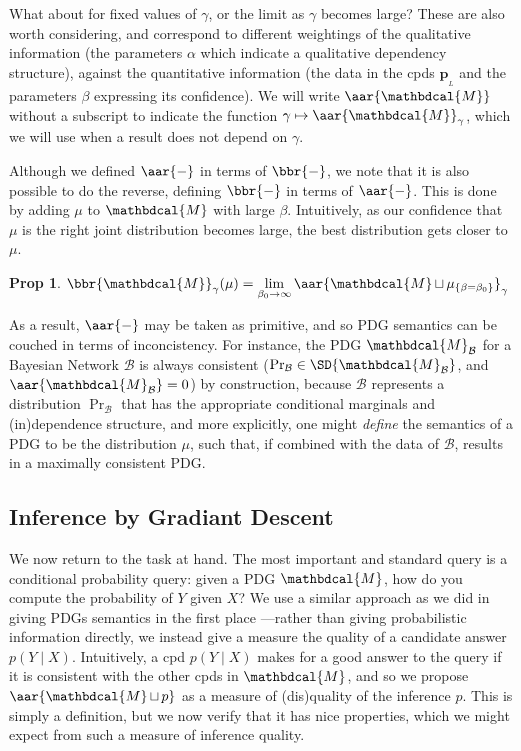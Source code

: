 \documentclass{article}
\theoremstyle{plain}
\newtheorem{prop}[theorem]{Prop}
\theoremstyle{definition}
\theoremstyle{remark}
\newcommand\mat[1]{\mathbf{#1}}
\newcommand{\bp}[1][L]{\mat{p}_{\!_{#1}\!}}
\newcommand{\dg}[1]{\mathbdcal{#1}}
\newcommand\smid{\!\mid\!}
\DeclareMathOperator{\bundle}{\sqcup}
\newcommand{\PDGof}[1]{{\dg M}_{#1}}
\begin{document}
What about for fixed values of $\gamma$, or the limit as $\gamma$ becomes large?
These are also worth considering, and correspond to different weightings of the
qualitative information (the parameters $\alpha$ which indicate a qualitative
dependency structure), against the quantitative information (the data in the
cpds $\bp{}$ and the parameters $\beta$ expressing its confidence). 
We will write $\aar{\dg M}$ without a subscript to indicate the function
$\gamma \mapsto \aar{\dg M}_\gamma$, which we will use when a result does not
depend on $\gamma$.

Although we defined $\aar{-}$ in terms of $\bbr{-}$, 
we note that it is also possible to do the reverse,
defining $\bbr{-}$ in terms of $\aar{-}$.
This is done by adding $\mu$ to $\dg M$ with large $\beta$. 
Intuitively, as our confidence that $\mu$ is the right
joint distribution becomes large, the best distribution
gets closer to $\mu$.

\begin{prop} \label{prop:sementics-via-inconsistency}
	$\displaystyle
		\bbr{\dg M}_\gamma(\mu) 
			= \lim_{\beta_0 \to \infty} \aar{\dg M \bundle \mu_{\{\beta=\beta_0\}}}_\gamma
	$
\end{prop}

As a result, $\aar{-}$  may be taken as primitive, and so PDG
semantics can be couched in terms of inconcistency. For instance, the
PDG $\PDGof{\mathcal B}$ for a Bayesian Network $\mathcal B$ is always
consistent ($\Pr_{\mathcal B} \in \SD{\PDGof{\mathcal B}}$, and $\aar{\PDGof{\mathcal B}} = 0$) 
by construction, because $\mathcal B$ represents a distribution 
$\Pr_{\mathcal B}$ that has the appropriate conditional marginals and
(in)dependence structure, and more explicitly, one might \emph{define}
the semantics of a PDG to be the distribution $\mu$, such that, if combined
with the data of $\mathcal B$, results in a maximally consistent PDG. 


\subsection{Inference by Gradiant Descent}
We now return to the task at hand. 
The most important and standard query is a conditional probability
query: given a PDG $\dg M$, how do you compute the probability of $Y$ given $X$?
We use a similar approach as we did in giving PDGs semantics in the first place
---rather than giving probabilistic information directly, we instead give a
measure the quality of a candidate answer $p(Y\smid X)$.
Intuitively, a cpd $p(Y\smid X)$ makes for a good answer to the query
if it is consistent with the other cpds in $\dg M$, and so we propose
$\aar{\dg M \bundle p}$ as a measure of (dis)quality of the inference $p$.
This is simply a definition, but we now verify that it has nice properties,
which we might expect from such a measure of inference quality. 
\end{document}

